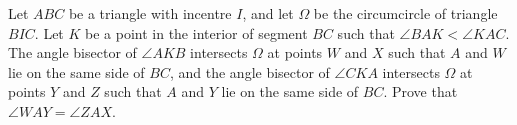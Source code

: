 Let $ABC$ be a triangle with incentre $I$, and let $\Omega$ be the circumcircle of triangle $BIC$. Let $K$ be a point in the interior of segment $BC$ such that $\angle BAK < \angle KAC$. The angle bisector of $\angle AKB$ intersects $\Omega$ at points $W$ and $X$ such that $A$ and $W$ lie on the same side of $BC$, and the angle bisector of $\angle CKA$ intersects $\Omega$ at points $Y$ and $Z$ such that $A$ and $Y$ lie on the same side of $BC$. Prove that $\angle WAY = \angle ZAX$.
